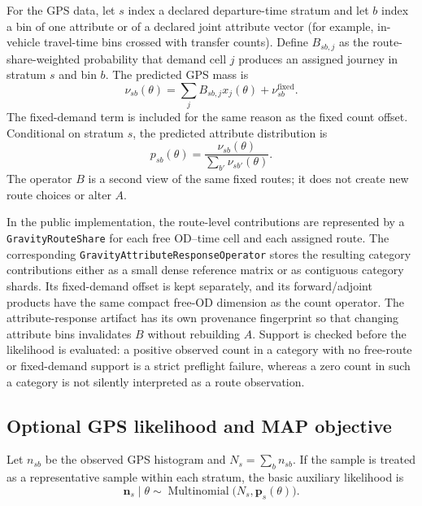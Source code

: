 For the GPS data, let $s$ index a declared departure-time stratum and let
$b$ index a bin of one attribute or of a declared joint attribute vector (for
example, in-vehicle travel-time bins crossed with transfer counts).  Define
$B_{sb,j}$ as the route-share-weighted probability that demand cell $j$
produces an assigned journey in stratum $s$ and bin $b$.  The predicted GPS
mass is
\begin{equation}
  \nu_{sb}(\theta)
  =\sum_j B_{sb,j}x_j(\theta)+\nu^{\mathrm{fixed}}_{sb}.
  \label{eq:gps-attribute-mass}
\end{equation}
The fixed-demand term is included for the same reason as the fixed count
offset.  Conditional on stratum $s$, the predicted attribute distribution is
\begin{equation}
  p_{sb}(\theta)
  =\frac{\nu_{sb}(\theta)}{\sum_{b'}\nu_{sb'}(\theta)}.
  \label{eq:gps-attribute-probability}
\end{equation}
The operator $B$ is a second view of the same fixed routes; it does not create
new route choices or alter $A$.

In the public implementation, the route-level contributions are represented
by a \texttt{GravityRouteShare} for each free OD--time cell and each assigned
route.  The corresponding
\texttt{GravityAttributeResponseOperator} stores the resulting category
contributions either as a small dense reference matrix or as contiguous
category shards.  Its fixed-demand offset is kept separately, and its
forward/adjoint products have the same compact free-OD dimension as the count
operator.  The attribute-response artifact has its own provenance fingerprint
so that changing attribute bins invalidates $B$ without rebuilding $A$.
Support is checked before the likelihood is evaluated: a positive observed
count in a category with no free-route or fixed-demand support is a strict
preflight failure, whereas a zero count in such a category is not silently
interpreted as a route observation.

\subsection{Optional GPS likelihood and MAP objective}

Let $n_{sb}$ be the observed GPS histogram and
$N_s=\sum_b n_{sb}$.  If the sample is treated as a representative sample
within each stratum, the basic auxiliary likelihood is
\begin{equation}
  \boldsymbol{n}_s\mid\theta
  \sim \operatorname{Multinomial}
       \bigl(N_s,\boldsymbol{p}_s(\theta)\bigr).
  \label{eq:gps-multinomial}
\end{equation}

